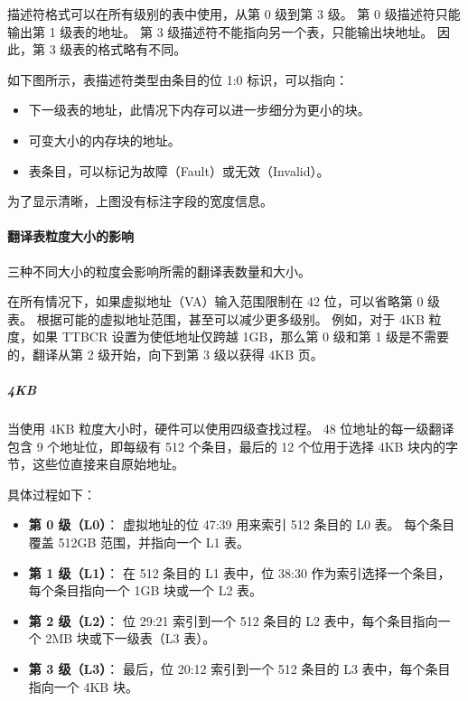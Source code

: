 描述符格式可以在所有级别的表中使用，从第 0 级到第 3 级。
第 0 级描述符只能输出第 1 级表的地址。
第 3 级描述符不能指向另一个表，只能输出块地址。
因此，第 3 级表的格式略有不同。

如下图所示，表描述符类型由条目的位 1:0 标识，可以指向：

\begin{itemize}
\item
  下一级表的地址，此情况下内存可以进一步细分为更小的块。
\item
  可变大小的内存块的地址。
\item
  表条目，可以标记为故障（Fault）或无效（Invalid）。
\end{itemize}


\begin{Tcbox}[title={Note}]
  为了显示清晰，上图没有标注字段的宽度信息。
\end{Tcbox}

\paragraph{翻译表粒度大小的影响}

三种不同大小的粒度会影响所需的翻译表数量和大小。

\begin{Tcbox}[title={Note}]
在所有情况下，如果虚拟地址（VA）输入范围限制在 42 位，可以省略第 0 级表。
根据可能的虚拟地址范围，甚至可以减少更多级别。
例如，对于 4KB 粒度，如果 TTBCR 设置为使低地址仅跨越 1GB，那么第 0 级和第 1 级是不需要的，翻译从第 2 级开始，向下到第 3 级以获得 4KB 页。
\end{Tcbox}

\subparagraph*{4KB}
当使用 4KB 粒度大小时，硬件可以使用四级查找过程。
48 位地址的每一级翻译包含 9 个地址位，即每级有 512 个条目，最后的 12 个位用于选择 4KB 块内的字节，这些位直接来自原始地址。

具体过程如下：

\begin{itemize}
  \item
  \textbf{第 0 级（L0）}：
    虚拟地址的位 47:39 用来索引 512 条目的 L0 表。
    每个条目覆盖 512GB 范围，并指向一个 L1 表。
  \item
  \textbf{第 1 级（L1）}：
    在 512 条目的 L1 表中，位 38:30 作为索引选择一个条目，每个条目指向一个 1GB 块或一个 L2 表。
  \item
  \textbf{第 2 级（L2）}：
    位 29:21 索引到一个 512 条目的 L2 表中，每个条目指向一个 2MB 块或下一级表（L3 表）。
  \item
  \textbf{第 3 级（L3）}：
    最后，位 20:12 索引到一个 512 条目的 L3 表中，每个条目指向一个 4KB 块。
\end{itemize}

